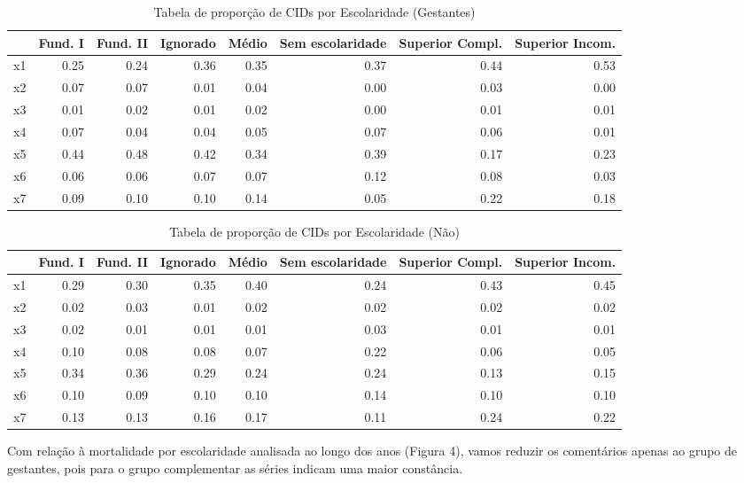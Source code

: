 \documentclass[
]{article}
\begin{document}
\begin{table}

\caption{\label{tab:unnamed-chunk-7}Tabela de proporção de CIDs por Escolaridade (Gestantes)}
\centering
\begin{tabular}[t]{l|r|r|r|r|r|r|r}
\hline
  & Fund. I & Fund. II & Ignorado & Médio & Sem escolaridade & Superior Compl. & Superior Incom.\\
\hline
x1 & 0.25 & 0.24 & 0.36 & 0.35 & 0.37 & 0.44 & 0.53\\
\hline
x2 & 0.07 & 0.07 & 0.01 & 0.04 & 0.00 & 0.03 & 0.00\\
\hline
x3 & 0.01 & 0.02 & 0.01 & 0.02 & 0.00 & 0.01 & 0.01\\
\hline
x4 & 0.07 & 0.04 & 0.04 & 0.05 & 0.07 & 0.06 & 0.01\\
\hline
x5 & 0.44 & 0.48 & 0.42 & 0.34 & 0.39 & 0.17 & 0.23\\
\hline
x6 & 0.06 & 0.06 & 0.07 & 0.07 & 0.12 & 0.08 & 0.03\\
\hline
x7 & 0.09 & 0.10 & 0.10 & 0.14 & 0.05 & 0.22 & 0.18\\
\hline
\end{tabular}
\end{table}

\begin{table}

\caption{\label{tab:unnamed-chunk-7}Tabela de proporção de CIDs por Escolaridade  (Não)}
\centering
\begin{tabular}[t]{l|r|r|r|r|r|r|r}
\hline
  & Fund. I & Fund. II & Ignorado & Médio & Sem escolaridade & Superior Compl. & Superior Incom.\\
\hline
x1 & 0.29 & 0.30 & 0.35 & 0.40 & 0.24 & 0.43 & 0.45\\
\hline
x2 & 0.02 & 0.03 & 0.01 & 0.02 & 0.02 & 0.02 & 0.02\\
\hline
x3 & 0.02 & 0.01 & 0.01 & 0.01 & 0.03 & 0.01 & 0.01\\
\hline
x4 & 0.10 & 0.08 & 0.08 & 0.07 & 0.22 & 0.06 & 0.05\\
\hline
x5 & 0.34 & 0.36 & 0.29 & 0.24 & 0.24 & 0.13 & 0.15\\
\hline
x6 & 0.10 & 0.09 & 0.10 & 0.10 & 0.14 & 0.10 & 0.10\\
\hline
x7 & 0.13 & 0.13 & 0.16 & 0.17 & 0.11 & 0.24 & 0.22\\
\hline
\end{tabular}
\end{table}

Com relação à mortalidade por escolaridade analisada ao longo dos anos
(Figura 4), vamos reduzir os comentários apenas ao grupo de gestantes,
pois para o grupo complementar as séries indicam uma maior constância.
\end{document}
